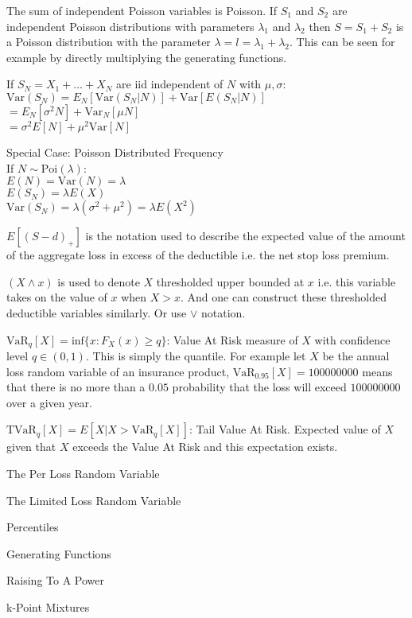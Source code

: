 The sum of independent Poisson variables is Poisson. If $S_1$ and $S_2$ are independent Poisson distributions with parameters $\lambda_1$ and $\lambda_2$ then $S=S_1+S_2$ is a Poisson distribution with the parameter $\lambda=l=\lambda_1+\lambda_2$. This can be seen for example by directly multiplying the generating functions.

If $S_N = X_1 + \dots + X_N$ are iid independent of $N$ with $\mu,\sigma$: \\
$\text{Var}(S_N) = E_N [\text{Var}(S_N | N)] + \text{Var} [E(S_N | N)]$ \\
$= E_N [\sigma^2 N] + \text{Var}_N [\mu N]$ \\
$= \sigma^2 E[N] + \mu^2 \text{Var} [N]$

Special Case: Poisson Distributed Frequency \\
If $N \sim \text{Poi}(\lambda)$: \\
$E(N) = \text{Var} (N) = \lambda$ \\
$E(S_N) = \lambda E(X)$ \\
$\text{Var} (S_N) = \lambda (\sigma^2 + \mu^2) = \lambda E(X^2)$

$E[(S-d)_+]$ is the notation used to describe the expected value of the amount of the aggregate loss in excess of the deductible i.e. the net stop loss premium.

$(X \wedge x)$ is used to denote $X$ thresholded upper bounded at $x$ i.e. this variable takes on the value of $x$ when $X > x$. And one can construct these thresholded deductible variables similarly. Or use $\vee$ notation.

$\text{VaR}_q[X] = \text{inf} \{ x:F_X(x)\ge q \}$: Value At Risk measure of $X$ with confidence level $q \in (0,1)$. This is simply the quantile. For example let $X$ be the annual loss random variable of an insurance product, $\text{VaR}_{0.95}[X] = 100000000$ means that there is no more than a $0.05$ probability that the loss will exceed $100000000$ over a given year.

$\text{TVaR}_q[X] = E[X | X > \text{VaR}_q [X]]$: Tail Value At Risk. Expected value of $X$ given that $X$ exceeds the Value At Risk and this expectation exists.

The Per Loss Random Variable

The Limited Loss Random Variable

Percentiles

Generating Functions

Raising To A Power

k-Point Mixtures

